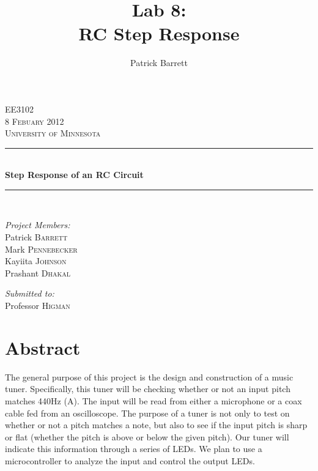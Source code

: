 \documentclass[12pt]{article}
\title{Lab 8:\\RC Step Response} %
\author{Patrick Barrett}
\date{}                                           %
\newcommand{\HRule}{\rule{\linewidth}{0.5mm}}
\begin{document}
\begin{singlespace}

\begin{center}
 
 

 
\textsc{\LARGE EE3102}\\[0.5cm]
 

\textsc{\Large 8 Febuary 2012}\\[0.5cm]

\textsc{\Large University of Minnesota}\\[0.5cm]
 
 
\HRule \\[0.4cm]
{ \huge \bfseries Step Response of an RC Circuit}\\[0.4cm]
 
\HRule \\[1cm]
 
\begin{minipage}{0.4\textwidth}
\begin{flushleft} \large
\emph{Project Members:}\\
Patrick \textsc{Barrett} \\
Mark \textsc{Pennebecker} \\
Kayiita  \textsc{Johnson} \\
Prashant \textsc{Dhakal} \\
\end{flushleft}
\end{minipage}
\begin{minipage}{0.4\textwidth}
\begin{flushright} \large
\emph{Submitted to:} \\
Professor \textsc{Higman}\\
\end{flushright}
\end{minipage}
\end{center}


\section*{Abstract}
The general purpose of this project is the design and construction of a music tuner. Specifically, this
tuner will be checking whether or not an input pitch matches 440Hz (A). The input will be read from
either a microphone or a coax cable fed from an oscilloscope. The purpose of a tuner is not only to test
on whether or not a pitch matches a note, but also to see if the input pitch is sharp or flat (whether the
pitch is above or below the given pitch). Our tuner will indicate this information through a series of
LEDs. We plan to use a microcontroller to analyze the input and control the output LEDs.
\end{singlespace}
\end{document}
